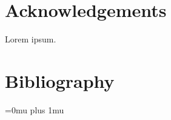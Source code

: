 \documentclass[fontsize=11pt, paper=a4, pagesize=auto, parskip=half, titlepage=on, english, ngerman]{scrartcl}
\begin{document}
\clearpage
\newpage
\section*{Acknowledgements}
Lorem ipsum.


\medskip

\clearpage
\newpage
\section*{Bibliography}
%
\Urlmuskip=0mu plus 1mu\relax




\end{document}
